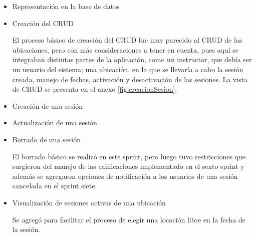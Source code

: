 \begin{itemize}


\item Representación en la base de datos

\item Creación del \gls{CRUD}

El proceso básico de creación del \gls{CRUD} fue muy parecido al \gls{CRUD} de las ubicaciones, pero con más consideraciones a tener en cuenta, pues aquí se integraban distintas partes de la aplicación, como un instructor, que debía ser un usuario del sistema; una ubicación, en la que se llevaría a cabo la sesión creada, manejo de fechas, activación y desactivación de las sesiones. La vista de \gls{CRUD} se presenta en el anexo \ref{fig:creacionSesion}.

\item Creación de una sesión

\item Actualización de una sesión

\item Borrado de una sesión

El borrado básico se realizó en este sprint, pero luego tuvo restricciones que surgieron del manejo de las calificaciones implementado en el sexto sprint y además se agregaron opciones de notificación a los usuarios de una sesión cancelada en el sprint siete. 

\item Visualización de sesiones activas de una ubicación

Se agregó para facilitar el proceso de elegir una locación libre en la fecha de la sesión.

\end{itemize}


